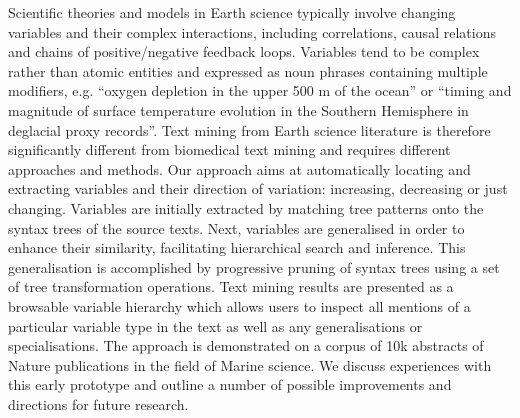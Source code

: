 Scientific theories and models in Earth science typically involve changing variables and their complex interactions, including correlations, causal relations and chains of positive/negative feedback loops. Variables tend to be complex rather than atomic entities and expressed as noun phrases containing multiple modifiers, e.g. ``oxygen depletion in the upper 500 m of the ocean'' or ``timing and magnitude of surface temperature evolution in the Southern Hemisphere in deglacial proxy records''. Text mining from Earth science literature is therefore significantly different from biomedical text mining and requires different approaches and methods. Our approach aims at automatically locating and extracting variables and their direction of variation: increasing, decreasing or just changing. Variables are initially extracted by matching tree patterns onto the syntax trees of the source texts. Next, variables are generalised in order to enhance their similarity, facilitating hierarchical search and inference. This generalisation is accomplished by progressive pruning of syntax trees using a set of tree transformation operations. Text mining results are presented as a browsable variable hierarchy which allows users to inspect all mentions of a particular variable type in the text as well as any generalisations or specialisations. The approach is demonstrated on a corpus of 10k abstracts of Nature publications in the field of Marine science. We discuss experiences with this early prototype and outline a number of possible improvements and directions for future research.
